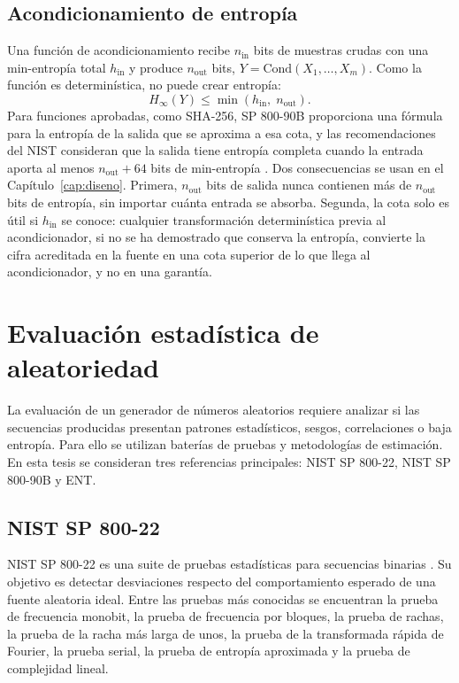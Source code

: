 \subsection{Acondicionamiento de entropía}

Una función de acondicionamiento recibe $n_{\text{in}}$ bits de muestras crudas con una min-entropía total $h_{\text{in}}$ y produce $n_{\text{out}}$ bits, $Y = \text{Cond}(X_1, \ldots, X_m)$. Como la función es determinística, no puede crear entropía:
\begin{equation}
    H_\infty(Y) \leq \min\left(h_{\text{in}},\; n_{\text{out}}\right).
    \label{eq:cota_acondicionamiento}
\end{equation}
Para funciones aprobadas, como SHA-256, SP 800-90B proporciona una fórmula para la entropía de la salida que se aproxima a esa cota, y las recomendaciones del NIST consideran que la salida tiene entropía completa cuando la entrada aporta al menos $n_{\text{out}} + 64$ bits de min-entropía \cite{Turan2018RecommendationGeneration}. Dos consecuencias se usan en el Capítulo~\ref{cap:diseno}. Primera, $n_{\text{out}}$ bits de salida nunca contienen más de $n_{\text{out}}$ bits de entropía, sin importar cuánta entrada se absorba. Segunda, la cota solo es útil si $h_{\text{in}}$ se conoce: cualquier transformación determinística previa al acondicionador, si no se ha demostrado que conserva la entropía, convierte la cifra acreditada en la fuente en una cota superior de lo que llega al acondicionador, y no en una garantía.

\section{Evaluación estadística de aleatoriedad}
\label{sec:evaluacion_estadistica}

La evaluación de un generador de números aleatorios requiere analizar si las secuencias producidas presentan patrones estadísticos, sesgos, correlaciones o baja entropía. Para ello se utilizan baterías de pruebas y metodologías de estimación. En esta tesis se consideran tres referencias principales: NIST SP 800-22, NIST SP 800-90B y ENT.

\subsection{NIST SP 800-22}

NIST SP 800-22 es una suite de pruebas estadísticas para secuencias binarias \cite{Rukhin2010AApplications}. Su objetivo es detectar desviaciones respecto del comportamiento esperado de una fuente aleatoria ideal. Entre las pruebas más conocidas se encuentran la prueba de frecuencia monobit, la prueba de frecuencia por bloques, la prueba de rachas, la prueba de la racha más larga de unos, la prueba de la transformada rápida de Fourier, la prueba serial, la prueba de entropía aproximada y la prueba de complejidad lineal.

